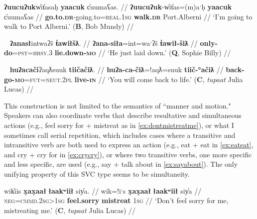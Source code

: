 \ex \label{ex:walktoalberni}
\begingl
\glpreamble \textbf{ʔuucuʔuk}w̓it̓asaḥ \textbf{yaacuk} c̓uumaʕas. //
\gla \textbf{ʔuucuʔuk}-w̓it̓as=(m)aˑḥ \textbf{yaacuk} c̓uumaʕas //
\glb \textbf{go.to.\textsc{dr}}-going.to=\textsc{real.1sg} \textbf{walk.\textsc{dr}} Port.Alberni //
\glft `I'm going to walk to Port Alberni.' (\textbf{B}, Bob Mundy) //
\endgl
\xe

\ex~ \label{ex:justliedown}
\begingl
\glpreamble \textbf{ʔanasł}intwaʔš \textbf{t̓awiłšƛ}. //
\gla \textbf{ʔana-siła}=int=waˑʔš \textbf{t̓awił-šiƛ} //
\glb \textbf{only-do}=\textsc{pst}=\textsc{hrsy.3} \textbf{lie.down-\textsc{mo}} //
\glft `He just laid down.' (\textbf{Q}, Sophie Billy) //
\endgl
\xe

\begin{comment}
\ex~ \label{ex:goaheadwent}
\begingl
\glpreamble nay̓iiʔak̓aƛin \textbf{kuw̓iła} \textbf{wałaak}. //
\gla nay̓iiʔak=!aƛ=(m)in \textbf{kuw̓iła} \textbf{wałaak} //
\glb immediately=\textsc{now}=\textsc{real.1pl} \textbf{go.ahead} \textbf{go.to.\textsc{dr}} //
\glft `We immediately went ahead and went.' (\textbf{B}, Marjorie Touchie) //
\endgl
\xe
\end{comment}

\ex~ \label{ex:comebacktolife}
\begingl
\glpreamble \textbf{huʔacači}ʔaqƛsuuk \textbf{tiičačiƛ}. //
\gla \textbf{huʔa-ca-čiƛ}=!aqƛ=suuk \textbf{tiič-°ačiƛ} //
\glb \textbf{back-go-\textsc{mo}}=\textsc{fut}=\textsc{neut.2pl} \textbf{live-\textsc{in}} //
\glft `You will come back to life.' (\textbf{C}, \textit{tupaat} Julia Lucas) //
\endgl
\xe

This construction is not limited to the semantics of ``manner and motion." Speakers can also coordinate verbs that describe resultative and simultaneous actions (e.g., feel sorry for + mistreat as in \ref{ex:dontmistreatme}), or what I sometimes call serial repetition, which includes cases where a transitive and intransitive verb are both used to express an action (e.g., eat + eat in \ref{ex:eateat}, and cry + cry for in \ref{ex:crycry}), or where two transitive verbs, one more specific and less specific, are used (e.g., say + talk about in \ref{ex:sayabout}). The only unifying property of this SVC type seems to be simultaneity.

\ex \label{ex:dontmistreatme}
\begingl
\glpreamble wik̓iis \textbf{x̣ax̣aał} \textbf{łaakʷiił} siy̓a. //
\gla wik=!iˑs \textbf{x̣ax̣aał} \textbf{łaakʷiił} siy̓a //
\glb \textsc{neg}=\textsc{cmmd.2sg>1sg} \textbf{feel.sorry} \textbf{mistreat} \textsc{1sg} //
\glft `Don't feel sorry for me, mistreating me.' (\textbf{C}, \textit{tupaat} Julia Lucas) //
\endgl
\xe


